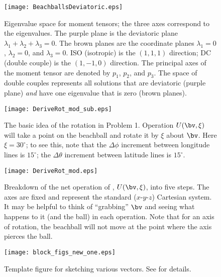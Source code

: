 \documentclass[11pt,titlepage,fleqn]{article}
\newcommand{\rotangB}{\xi}    %
\newcommand{\rotvec}{\bv}      %
\newcommand{\Rmat}{R}
\newcommand{\Umat}{U}
\begin{document}
\clearpage\pagebreak
\begin{figure}
\centering
\texttt{[image: BeachballsDeviatoric.eps]}
\caption[]
{{
Eigenvalue space for moment tensors; the three axes correspond to the eigenvalues.
The purple plane is the deviatoric plane $\lambda_1 + \lambda_2 + \lambda_3 = 0$.
The brown planes are the coordinate planes $\lambda_1 = 0$, $\lambda_2 = 0$, and $\lambda_3 = 0$.
ISO (isotropic) is the $(1,1,1)$ direction; DC (double couple) is the $(1,-1,0)$ direction.
The principal axes of the moment tensor are denoted by $p_1$, $p_2$, and $p_3$.
 The space of double couples represents all solutions that are deviatoric (purple plane) {\em and} have one eigenvalue that is zero (brown planes).
\label{fig:lam}
}}
\end{figure}

\begin{figure}
\centering
\texttt{[image: DeriveRot\_mod\_sub.eps]}
\caption[]
{{
The basic idea of the rotation in Problem 1.
Operation $\Umat(\rotvec,\rotangB)$ will take a point on the beachball and rotate it by $\rotangB$ about $\rotvec$.
Here $\rotangB = 30^\circ$; to see this, note that the $\Delta\phi$ increment between longitude lines is $15^\circ$; the $\Delta\theta$ increment between latitude lines is $15^\circ$.
\label{fig:rotsub}
}}
\end{figure}

\clearpage\pagebreak
\begin{figure}
\centering
\texttt{[image: DeriveRot\_mod.eps]}
\caption[]
{{
Breakdown of the net operation of , $\Umat(\rotvec,\rotangB)$, into five steps.
The axes are fixed and represent the standard ($x$-$y$-$z$) Cartesian system. It may be helpful to think of ``grabbing'' $\rotvec$ and seeing what happens to it (and the ball) in each operation. Note that for an axis of rotation, the beachball will not move at the point where the axis pierces the ball.
\label{fig:rot}
}}
\end{figure}

\clearpage\pagebreak


\begin{figure}
\centering
\texttt{[image: block\_figs\_new\_one.eps]}
\caption[]
{{
Template figure for sketching various vectors.
See  for details.
\label{fig:block}
}}
\end{figure}

\end{document}
